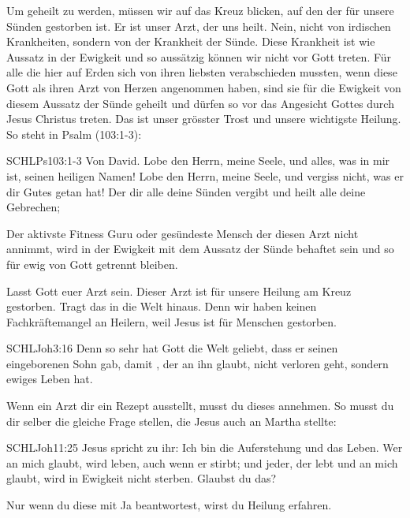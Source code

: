 \begin{otsblock}
        Um geheilt zu werden, müssen wir auf das Kreuz blicken, auf den der für unsere Sünden gestorben ist. Er ist unser Arzt, der uns heilt. Nein, nicht von irdischen Krankheiten, sondern von der Krankheit der Sünde. Diese Krankheit ist wie Aussatz in der Ewigkeit und so aussätzig können wir nicht vor Gott treten. Für alle die hier auf Erden sich von ihren liebsten verabschieden mussten, wenn diese Gott als ihren Arzt von Herzen angenommen haben, sind sie für die Ewigkeit von diesem Aussatz der Sünde geheilt und dürfen so vor das Angesicht Gottes durch Jesus Christus treten. Das ist unser grösster Trost und unsere wichtigste Heilung. So steht in Psalm (103:1-3):
        \begin{bibelbox}{SCHL}{Ps}{103:1-3}
            Von David. Lobe den Herrn, meine Seele, und alles, was in mir ist, seinen heiligen Namen! Lobe den Herrn, meine Seele, und vergiss nicht, was er dir Gutes getan hat! Der dir alle deine Sünden vergibt und heilt alle deine Gebrechen;
        \end{bibelbox}
        
        Der aktivste Fitness Guru oder gesündeste Mensch der diesen Arzt nicht annimmt, wird in der Ewigkeit mit dem Aussatz der Sünde behaftet sein und so für ewig von Gott getrennt bleiben.

        Lasst Gott euer Arzt sein. Dieser Arzt ist für unsere Heilung am Kreuz gestorben. Tragt das in die Welt hinaus. Denn wir haben keinen Fachkräftemangel an Heilern, weil Jesus ist für  Menschen gestorben. 
        \begin{bibelbox}{SCHL}{Joh}{3:16}
        Denn so sehr hat Gott die Welt geliebt, dass er seinen eingeborenen Sohn gab, damit , der an ihn glaubt, nicht verloren geht, sondern ewiges Leben hat.
        \end{bibelbox}
        
        Wenn ein Arzt dir ein Rezept ausstellt, musst du dieses annehmen. So musst du dir selber die gleiche Frage stellen, die Jesus auch an Martha stellte:
        \begin{bibelbox}{SCHL}{Joh}{11:25}
            Jesus spricht zu ihr: Ich bin die Auferstehung und das Leben. Wer an mich glaubt, wird leben, auch wenn er stirbt; und jeder, der lebt und an mich glaubt, wird in Ewigkeit nicht sterben. Glaubst du das?
        \end{bibelbox}
         Nur wenn du diese mit Ja beantwortest, wirst du Heilung erfahren.


\end{otsblock}
